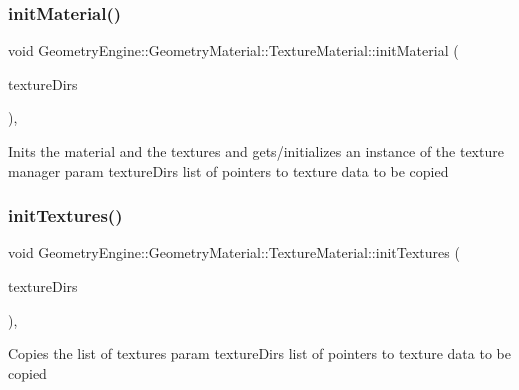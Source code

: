 \subsubsection{\texorpdfstring{initMaterial()}{initMaterial()}}
{\footnotesize\ttfamily void Geometry\+Engine\+::\+Geometry\+Material\+::\+Texture\+Material\+::init\+Material (\begin{DoxyParamCaption}\item[{const std\+::list$<$ \mbox{\hyperlink{class_geometry_engine_1_1_geometry_material_1_1_texture_parameters}{Texture\+Parameters}} $\ast$ $>$ \&}]{texture\+Dirs }\end{DoxyParamCaption})\hspace{0.3cm}{\ttfamily [protected]}, {\ttfamily [virtual]}}

Inits the material and the textures and gets/initializes an instance of the texture manager param texture\+Dirs list of pointers to texture data to be copied \mbox{\label{class_geometry_engine_1_1_geometry_material_1_1_texture_material_ae2a34b3c00d6aecd9bdc686042cdf892}} 
\subsubsection{\texorpdfstring{initTextures()}{initTextures()}}
{\footnotesize\ttfamily void Geometry\+Engine\+::\+Geometry\+Material\+::\+Texture\+Material\+::init\+Textures (\begin{DoxyParamCaption}\item[{const std\+::list$<$ \mbox{\hyperlink{class_geometry_engine_1_1_geometry_material_1_1_texture_parameters}{Texture\+Parameters}} $\ast$ $>$ \&}]{texture\+Dirs }\end{DoxyParamCaption})\hspace{0.3cm}{\ttfamily [protected]}, {\ttfamily [virtual]}}

Copies the list of textures param texture\+Dirs list of pointers to texture data to be copied \mbox{\label{class_geometry_engine_1_1_geometry_material_1_1_texture_material_a985cdde7240f2acb18cd2944c5ca6193}} 
